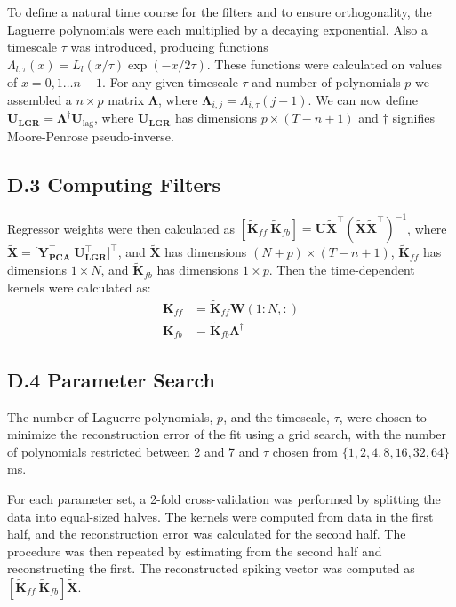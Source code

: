 To define a natural time course for the filters and to ensure orthogonality, the Laguerre polynomials were each multiplied by a decaying exponential. Also a timescale $\tau$ was introduced, producing functions $\Lambda_{l,\tau}(x)=L_l(x/\tau)\exp(-x/2\tau)$. These functions were calculated on values of $x=0,1\dots n-1$. For any given timescale $\tau$ and number of polynomials $p$ we assembled a $n\times p$ matrix $\mathbf{\Lambda}$, where $\mathbf{\Lambda}_{i,j}=\Lambda_{i,\tau}(j-1)$. We can now define $\mathbf{U_{\text{LGR}}} = \mathbf{\Lambda}^\dagger \mathbf{U}_{\text{lag}}$, where $\mathbf{U_{\text{LGR}}}$ has dimensions $p \times (T-n+1)$ and $\dagger$ signifies Moore-Penrose pseudo-inverse.
\subsection*{D.3 Computing Filters}
Regressor weights were then calculated as $[ \mathbf{\tilde{K}}_{ff} \ \mathbf{\tilde{K}}_{fb}] = \mathbf{U}\mathbf{\tilde{X}}^\top(\mathbf{\tilde{X}} \mathbf{\tilde{X}}^\top)^{-1} $, where $\mathbf{\tilde{X}} = [ \mathbf{Y_{\text{PCA}}^\top} \ \mathbf{U_{\text{LGR}}^\top]^\top}$, and $\mathbf{\tilde{X}}$ has dimensions $(N+p) \times (T-n+1)$, $\mathbf{\tilde{K}}_{ff}$ has dimensions $1 \times N$, and $\mathbf{\tilde{K}}_{fb}$ has dimensions $1 \times p$.
Then the time-dependent kernels were calculated as:
\[
\begin{aligned}
    \mathbf{K}_{ff} & = \mathbf{\tilde{K}}_{ff}\mathbf{W}(1:N, :) \\
    \mathbf{K}_{fb} & = \mathbf{\tilde{K}}_{fb} \mathbf{\Lambda}^\dagger
\end{aligned}
\]
\subsection*{D.4 Parameter Search}
The number of Laguerre polynomials, $p$, and the timescale, $\tau$, were chosen to minimize the reconstruction error of the fit using a grid search, with the number of polynomials restricted between 2 and 7 and $\tau$ chosen from $\{1, 2, 4, 8, 16, 32, 64\}$ms.

For each parameter set, a 2-fold cross-validation was performed by splitting the data into equal-sized halves. The kernels were computed from data in the first half, and the reconstruction error was calculated for the second half. The procedure was then repeated by estimating from the second half and reconstructing the first. The reconstructed spiking vector was computed as $[ \mathbf{\tilde{K}}_{ff} \ \mathbf{\tilde{K}}_{fb}]\mathbf{\tilde{X}}$.

